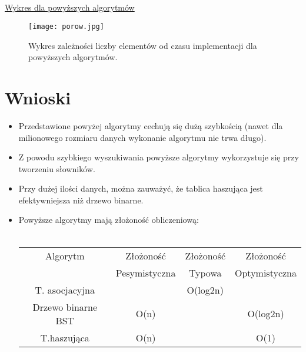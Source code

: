 \documentclass[11pt]{article}
\begin{document}
\\ \\ \\  \\ \\ \\ \\ \\ \\
 \underline{Wykres dla powyższych algorytmów}
 \\
\begin{figure}[ht!]
\centering
\texttt{[image: porow.jpg]}
\caption{Wykres zależności liczby elementów od czasu implementacji dla powyższych algorytmów.}
\label{overflow}
\end{figure}

\section{Wnioski}
\begin{itemize}
\item Przedstawione powyżej algorytmy cechują się dużą szybkością (nawet dla milionowego rozmiaru danych wykonanie algorytmu nie trwa długo). 
\item Z powodu szybkiego wyszukiwania powyższe algorytmy wykorzystuje się przy tworzeniu słowników.
\item Przy dużej ilości danych, można zauważyć, że tablica haszująca jest efektywniejsza niż drzewo binarne. 
\item Powyższe algorytmy mają złożoność obliczeniową: \\ \\
\begin{tabular}{|c|c|c|c|}
  \hline
  Algorytm & Złożoność &Złożoność& Złożoność \\
  &Pesymistyczna & Typowa &Optymistyczna \\ \hline
  \hline 
  T. asocjacyjna&&O(log2n)& \\ \hline
  Drzewo binarne BST&O(n)&&O(log2n)\\ \hline
  T.haszująca&O(n)&&O(1) \\ \hline
  \hline
  \end{tabular} 
\end{itemize}
\end{document}
